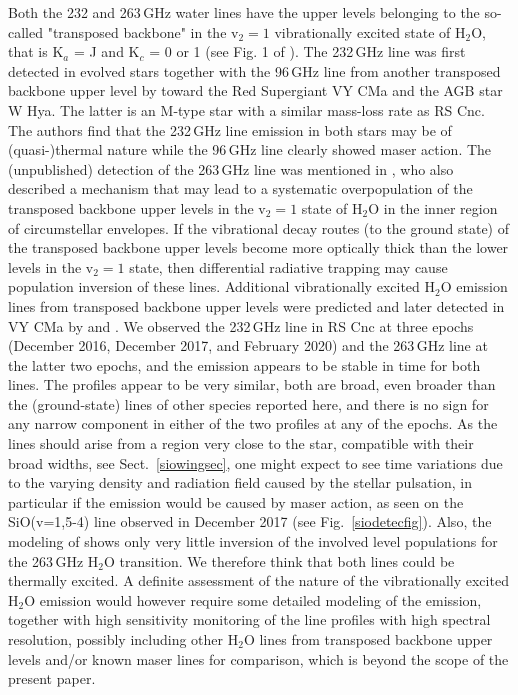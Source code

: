 \documentclass{aa}
\begin{document}
Both the 232 and 263\,GHz water lines have the upper levels belonging
to the so-called "transposed backbone" in the v$_2=1$ vibrationally
excited state of H$_2$O, that is K$_a$ = J and K$_c$ = 0 or 1 (see Fig. 1
of \citet{1993LNP...412..399A}).  The 232\,GHz line was first detected
in evolved stars together with the 96\,GHz line from another
transposed backbone upper level by \citet{mm89} toward the Red
Supergiant VY CMa and the AGB star W Hya.  The latter is an M-type
star with a similar mass-loss rate as RS Cnc. The authors find that
the 232\,GHz line emission in both stars may be of (quasi-)thermal
nature while the 96\,GHz line clearly showed maser action.  The
(unpublished) detection of the 263\,GHz line was mentioned in
\citet{1993LNP...412..399A}, who also described a mechanism that may
lead to a systematic overpopulation of the transposed backbone upper
levels in the v$_2=1$ state of H$_2$O in the inner region of
circumstellar envelopes. If the vibrational decay routes (to the
ground state) of the transposed backbone upper levels become more
optically thick than the lower levels in the v$_2=1$ state, then
differential radiative trapping may cause population inversion of
these lines. Additional vibrationally excited H$_2$O emission lines
from transposed backbone upper levels were predicted and later
detected in VY CMa by \citet{2006A&A...454L.107M} and
\citet{2013ApJS..209...38K}.  We observed the 232\,GHz line in RS Cnc
at three epochs (December 2016, December 2017, and February 2020) and
the 263\,GHz line at the latter two epochs, and the emission appears
to be stable in time for both lines. The profiles appear to be very
similar, both are broad, even broader than the (ground-state) lines of
other species reported here, and there is no sign for any narrow
component in either of the two profiles at any of the epochs. As the
lines should arise from a region very close to the star, compatible
with their broad widths, see Sect.~\ref{siowingsec}, one might expect
to see time variations due to the varying density and radiation field
caused by the stellar pulsation, in particular if the emission would
be caused by maser action, as seen on  the SiO(v=1,5-4) line observed
in December 2017 (see Fig.~\ref{siodetecfig}). Also, the modeling of
\citet{gmretal2016} shows only very little inversion of the involved
level populations for the 263\,GHz H$_2$O transition. We therefore
think that both lines could be thermally excited. A definite
assessment of the nature of the vibrationally excited H$_2$O emission
would however require some detailed modeling of the emission, together
with  high sensitivity monitoring of the line profiles with high
spectral resolution, possibly including other H$_2$O lines from
transposed backbone upper levels and/or known maser lines for
comparison, which is beyond the scope of the present paper.
\end{document}
